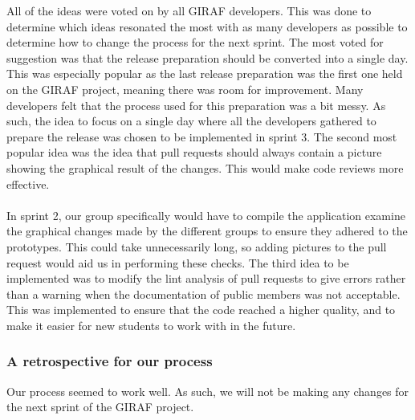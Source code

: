\noindent
All of the ideas were voted on by all GIRAF developers.
This was done to determine which ideas resonated the most with as many developers as possible to determine how to change the process for the next sprint.
The most voted for suggestion was that the release preparation should be converted into a single day.
This was especially popular as the last release preparation was the first one held on the GIRAF project, meaning there was room for improvement.
Many developers felt that the process used for this preparation was a bit messy.
As such, the idea to focus on a single day where all the developers gathered to prepare the release was chosen to be implemented in sprint 3.
The second most popular idea was the idea that pull requests should always contain a picture showing the graphical result of the changes.
This would make code reviews more effective.
\\\\
In sprint 2, our group specifically would have to compile the application  examine the graphical changes made by the different groups to ensure they adhered to the prototypes.
This could take unnecessarily long, so adding pictures to the pull request would aid us in performing these checks.
The third idea to be implemented was to modify the lint analysis of pull requests to give errors rather than a warning when the documentation of public members was not acceptable.
This was implemented to ensure that the code reached a higher quality, and to make it easier for new students to work with in the future.

\subsubsection{A retrospective for our process}
Our process seemed to work well.
As such, we will not be making any changes for the next sprint of the GIRAF project.
